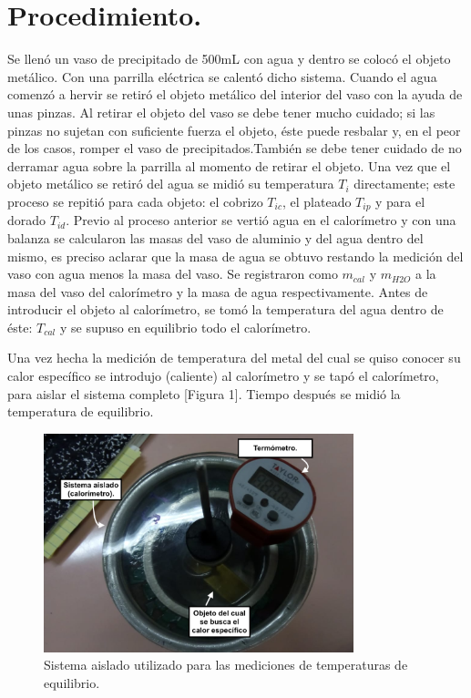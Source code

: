 \documentclass[a4paper]{article}
\begin{document}
\section*{Procedimiento.}
Se llenó un vaso de precipitado de 500mL con agua y dentro se colocó el  objeto metálico. Con una parrilla eléctrica se calentó dicho sistema. Cuando el agua comenzó a hervir se retiró el objeto metálico del interior del vaso con la ayuda de unas pinzas. Al retirar el objeto del vaso se debe tener mucho cuidado; si las pinzas no sujetan con suficiente fuerza el objeto, éste puede resbalar y, en el peor de los casos, romper el vaso de precipitados.También se debe tener cuidado de no derramar agua sobre la parrilla al momento de retirar el objeto. Una vez que el objeto metálico se retiró del agua se midió su temperatura $T_{i}$ directamente; este proceso se repitió para cada objeto: el cobrizo $T_{ic}$,  el plateado $T_{ip}$ y para el dorado $T_{id}$. Previo al proceso anterior se vertió agua en el calorímetro y con una balanza se calcularon las masas del vaso de aluminio y del agua dentro del mismo, es preciso aclarar que la masa de agua se obtuvo restando la medición del vaso con agua menos la masa del vaso. Se registraron como $m_{cal}$ y $m_{H2O}$ a la masa del vaso del calorímetro y la masa de agua respectivamente. Antes de introducir el objeto al calorímetro, se tomó la temperatura del agua dentro de éste: $T_{cal}$ y se supuso en equilibrio todo el calorímetro.

Una vez hecha la medición de temperatura del metal del cual se quiso conocer su calor específico se introdujo (caliente) al calorímetro y se tapó el calorímetro, para aislar el sistema completo [Figura 1]. Tiempo después se midió la temperatura de equilibrio.

\begin{figure}[H]
    \centering
    \includegraphics[width=9cm]{Calorimetro.png}
    \caption{Sistema aislado utilizado para las mediciones de temperaturas de equilibrio.}
\end{figure}
\end{document}
